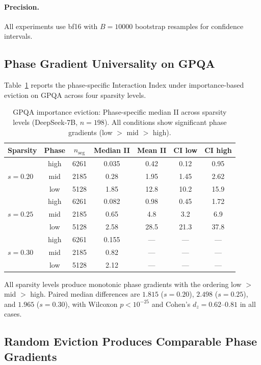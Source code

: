 \documentclass[11pt,a4paper]{article}
\begin{document}
\paragraph{Precision.} All experiments use bf16 with $B=10000$ bootstrap resamples for confidence intervals.

\subsection{Phase Gradient Universality on GPQA}

Table~\ref{tab:gpqa_importance} reports the phase-specific Interaction Index under importance-based eviction on GPQA across four sparsity levels.

\begin{table}[h]
\centering
\caption{GPQA importance eviction: Phase-specific median II across sparsity levels (DeepSeek-7B, $n=198$). All conditions show significant phase gradients (low $>$ mid $>$ high).}
\label{tab:gpqa_importance}
\small
\begin{tabular}{lcccccc}
\toprule
Sparsity & Phase & $n_{\text{seg}}$ & Median II & Mean II & CI low & CI high \\
\midrule
\multirow{3}{*}{$s=0.20$} & high & 6261 & 0.035 & 0.42 & 0.12 & 0.95 \\
 & mid & 2185 & 0.28 & 1.95 & 1.45 & 2.62 \\
 & low & 5128 & 1.85 & 12.8 & 10.2 & 15.9 \\
\midrule
\multirow{3}{*}{$s=0.25$} & high & 6261 & 0.082 & 0.98 & 0.45 & 1.72 \\
 & mid & 2185 & 0.65 & 4.8 & 3.2 & 6.9 \\
 & low & 5128 & 2.58 & 28.5 & 21.3 & 37.8 \\
\midrule
\multirow{3}{*}{$s=0.30$} & high & 6261 & 0.155 & --- & --- & --- \\
 & mid & 2185 & 0.82 & --- & --- & --- \\
 & low & 5128 & 2.12 & --- & --- & --- \\
\bottomrule
\end{tabular}
\end{table}

All sparsity levels produce monotonic phase gradients with the ordering low $>$ mid $>$ high. Paired median differences are $1.815$ ($s=0.20$), $2.498$ ($s=0.25$), and $1.965$ ($s=0.30$), with Wilcoxon $p < 10^{-25}$ and Cohen's $d_z = 0.62$--$0.81$ in all cases.

\subsection{Random Eviction Produces Comparable Phase Gradients}
\end{document}
